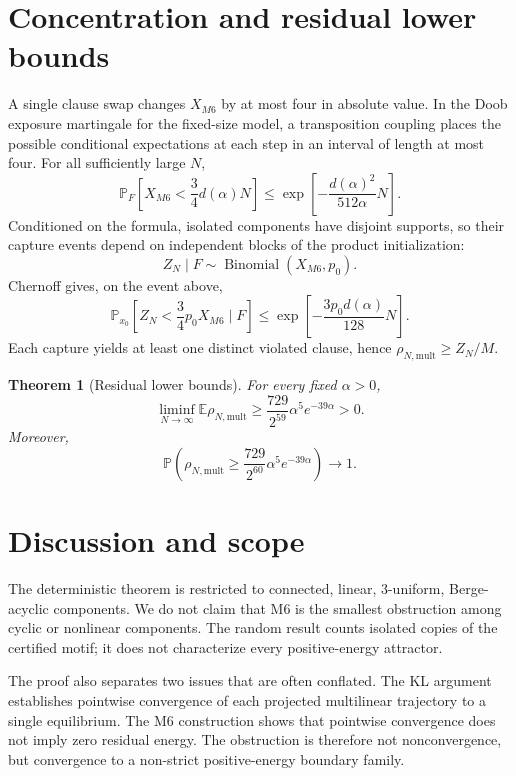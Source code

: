 \documentclass[11pt,a4paper]{article}
\newtheorem{theorem}{Theorem}[section]
\begin{document}
\section{Concentration and residual lower bounds}
A single clause swap changes $X_{M6}$ by at most four in absolute value. In the Doob exposure martingale for the fixed-size model, a transposition coupling places the possible conditional expectations at each step in an interval of length at most four. For all sufficiently large $N$,
\begin{equation}
\mathbb P_F\!\left[X_{M6}<\frac34d(\alpha)N\right]\le \exp\!\left[-\frac{d(\alpha)^2}{512\alpha}N\right].
\end{equation}
Conditioned on the formula, isolated components have disjoint supports, so their capture events depend on independent blocks of the product initialization:
\[
Z_N\mid F\sim\operatorname{Binomial}(X_{M6},p_0).
\]
Chernoff gives, on the event above,
\[
\mathbb P_{x_0}\!\left[Z_N<\frac34p_0X_{M6}\mid F\right]\le \exp\!\left[-\frac{3p_0d(\alpha)}{128}N\right].
\]
Each capture yields at least one distinct violated clause, hence $\rho_{N,\mathrm{mult}}\ge Z_N/M$.

\begin{theorem}[Residual lower bounds]
For every fixed $\alpha>0$,
\[
\liminf_{N\to\infty}\mathbb E\rho_{N,\mathrm{mult}}\ge \frac{729}{2^{59}}\alpha^5e^{-39\alpha}>0.
\]
Moreover,
\[
\mathbb P\!\left(\rho_{N,\mathrm{mult}}\ge \frac{729}{2^{60}}\alpha^5e^{-39\alpha}\right)\to1.
\]
\end{theorem}

\section{Discussion and scope}
The deterministic theorem is restricted to connected, linear, 3-uniform, Berge-acyclic components. We do not claim that M6 is the smallest obstruction among cyclic or nonlinear components. The random result counts isolated copies of the certified motif; it does not characterize every positive-energy attractor.

The proof also separates two issues that are often conflated. The KL argument establishes pointwise convergence of each projected multilinear trajectory to a single equilibrium. The M6 construction shows that pointwise convergence does not imply zero residual energy. The obstruction is therefore not nonconvergence, but convergence to a non-strict positive-energy boundary family.
\end{document}
